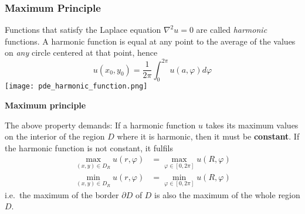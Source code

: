 \subsubsection{Maximum Principle}
Functions that satisfy the Laplace equation $\nabla^2 u=0$ are called \textit{harmonic} functions. A harmonic function is equal at any point to the average of the values on \textit{any} circle centered at that point, hence
\begin{equation*}
    u(x_0, y_0)=\frac{1}{2\pi}\int_{0}^{2\pi}u(a,\varphi)d\varphi
\end{equation*}
\texttt{[image: pde\_harmonic\_function.png]}

\textbf{Maximum principle}

The above property demands: If a harmonic function $u$ takes its maximum values on the interior of the region $D$ where it is harmonic, then it must be \textbf{constant}.
If the harmonic function is not constant, it fulfils
\begin{align*}
    \max_{(x,y)\in D_R} u(r,\varphi) & = \max_{\varphi\in[0,2\pi]} u(R,\varphi) \\
    \min_{(x,y)\in D_R} u(r,\varphi) & = \min_{\varphi\in[0,2\pi]} u(R,\varphi)
\end{align*}
i.e.\ the maximum of the border $\partial D$ of $D$ is also the maximum of the whole region $D$.

